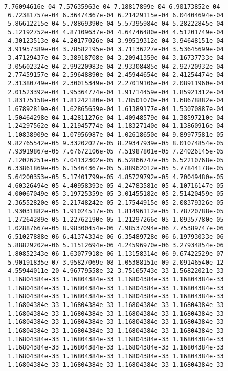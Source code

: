 \documentclass[11pt]{article}
\begin{document}
\begin{Verbatim}[commandchars=\\\{\}]
 7.76094616e-04 7.57635963e-04 7.18817899e-04 6.90173852e-04
 6.72381757e-04 6.36474367e-04 6.21429115e-04 6.04404694e-04
 5.86612215e-04 5.78869390e-04 5.57395984e-04 5.28222845e-04
 5.12192752e-04 4.87109637e-04 4.64746480e-04 4.51201749e-04
 4.30123513e-04 4.20177026e-04 3.99519312e-04 3.94648151e-04
 3.91957389e-04 3.78582195e-04 3.71136227e-04 3.53645699e-04
 3.47129437e-04 3.38918708e-04 3.20941359e-04 3.16737733e-04
 3.05602324e-04 2.99220983e-04 2.93308485e-04 2.92720932e-04
 2.77459157e-04 2.59648890e-04 2.45944654e-04 2.41254474e-04
 2.31380749e-04 2.30015349e-04 2.27019106e-04 2.08911960e-04
 2.01523392e-04 1.95364774e-04 1.91714459e-04 1.85921312e-04
 1.83175158e-04 1.81242180e-04 1.78501070e-04 1.68678882e-04
 1.67892819e-04 1.62865659e-04 1.61389177e-04 1.53070887e-04
 1.50464298e-04 1.42811276e-04 1.40948579e-04 1.38597210e-04
 1.24297562e-04 1.21945774e-04 1.18327140e-04 1.13860916e-04
 1.10838909e-04 1.07956987e-04 1.02618650e-04 9.89977581e-05
 9.82765542e-05 9.33202027e-05 8.29347939e-05 8.01074854e-05
 7.93919867e-05 7.67672106e-05 7.51987801e-05 7.24026145e-05
 7.12026251e-05 7.04132302e-05 6.52866747e-05 6.52210768e-05
 6.33861869e-05 6.15464367e-05 5.88962012e-05 5.77844178e-05
 5.64200353e-05 5.17401799e-05 4.85729792e-05 4.70049480e-05
 4.60326494e-05 4.40958393e-05 4.24783581e-05 4.10716147e-05
 4.00067049e-05 3.19725359e-05 3.01455182e-05 2.51420459e-05
 2.36552820e-05 2.21748242e-05 2.17544915e-05 2.08379326e-05
 1.93031882e-05 1.91024517e-05 1.81496112e-05 1.78720788e-05
 1.27264289e-05 1.22762190e-05 1.21297266e-05 1.09357780e-05
 1.02887667e-05 8.98300454e-06 7.98537094e-06 7.75389747e-06
 6.51027888e-06 6.41374334e-06 6.35489728e-06 6.19793033e-06
 5.88829202e-06 5.11512694e-06 4.24596970e-06 3.27934854e-06
 1.80852343e-06 1.63077918e-06 1.13158314e-06 9.67422529e-07
 5.90191835e-07 3.95827069e-08 1.05388151e-09 2.09146540e-12
 4.55944011e-20 4.96779558e-32 3.75165743e-33 1.56822021e-33
 1.16804384e-33 1.16804384e-33 1.16804384e-33 1.16804384e-33
 1.16804384e-33 1.16804384e-33 1.16804384e-33 1.16804384e-33
 1.16804384e-33 1.16804384e-33 1.16804384e-33 1.16804384e-33
 1.16804384e-33 1.16804384e-33 1.16804384e-33 1.16804384e-33
 1.16804384e-33 1.16804384e-33 1.16804384e-33 1.16804384e-33
 1.16804384e-33 1.16804384e-33 1.16804384e-33 1.16804384e-33
 1.16804384e-33 1.16804384e-33 1.16804384e-33 1.16804384e-33
 1.16804384e-33 1.16804384e-33 1.16804384e-33 1.16804384e-33
 1.16804384e-33 1.16804384e-33 1.16804384e-33 1.16804384e-33
 1.16804384e-33 1.16804384e-33 1.16804384e-33 1.16804384e-33
 1.16804384e-33 1.16804384e-33 1.16804384e-33 1.16804384e-33

\end{Verbatim}
\end{document}
